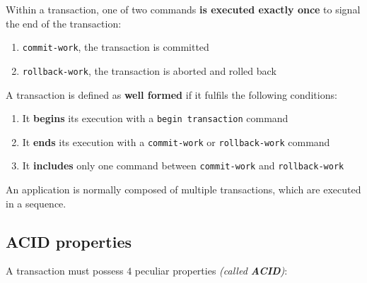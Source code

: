 \documentclass[english]{article}
\begin{document}
Within a transaction, one of two commands \textbf{is executed exactly once} to signal the end of the transaction:

\begin{enumerate}
  \item \texttt{commit-work}, the transaction is committed
  \item \texttt{rollback-work}, the transaction is aborted and rolled back
\end{enumerate}

A transaction is defined as \textbf{well formed} if it fulfils the following conditions:

\begin{enumerate}
  \item It \textbf{begins} its execution with a \texttt{begin transaction} command
  \item It \textbf{ends} its execution with a \texttt{commit-work} or \texttt{rollback-work} command
  \item It \textbf{includes} only one command between \texttt{commit-work} and \texttt{rollback-work}
\end{enumerate}

An application is normally composed of multiple transactions, which are executed in a sequence.

\subsection{ACID properties}
\label{sec:ACID-properties}

A transaction must possess \(4\) peculiar properties \textit{(called \textbf{ACID})}:
\end{document}
